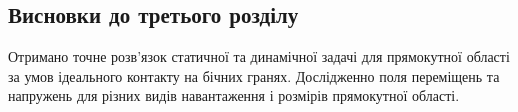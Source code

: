 \subsection{Висновки до третього розділу}
Отримано точне розв'язок статичної та динамічної задачі для прямокутної області за умов ідеального контакту на бічних гранях.
Дослідженно поля переміщень та напружень для різних видів навантаження і розмірів прямокутної області.